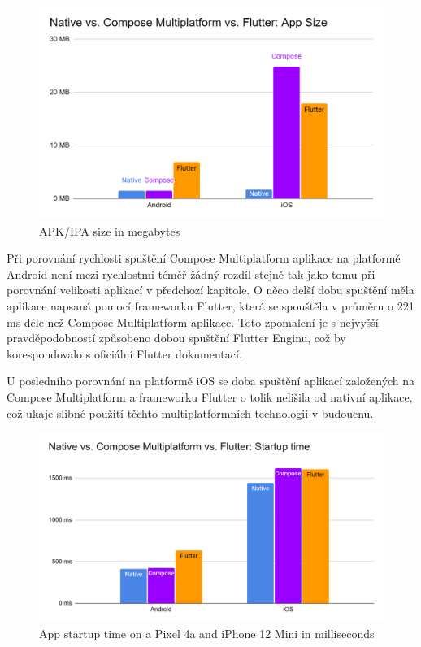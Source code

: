 \begin{figure}[H]
  \centering
  \includegraphics[width=.7\textwidth]{chart_app_sizes.png}
  \caption{APK/IPA size in megabytes}
  \label{fig:chart_app_sizes}
\end{figure}


Při porovnání rychlosti spuštění Compose Multiplatform aplikace na platformě Android není mezi rychlostmi téměř žádný
rozdíl stejně tak jako tomu při porovnání velikosti aplikací v předchozí kapitole. O něco delší dobu spuštění měla
aplikace napsaná pomocí frameworku Flutter, která se spouštěla v průměru o 221 ms déle než Compose Multiplatform aplikace. 
Toto zpomalení je s nejvyšší pravděpodobností způsobeno dobou spuštění Flutter Enginu, což by korespondovalo s oficiální
Flutter dokumentací. \cite{flutterPerformance}

U posledního porovnání na platformě iOS se doba spuštění aplikací založených na Compose Multiplatform a frameworku 
Flutter o tolik nelišila od nativní aplikace, což ukaje slibné použití těchto multiplatformních technologií v budoucnu.

\begin{figure}[H]
  \centering
  \includegraphics[width=.7\textwidth]{chart_startup_times.png}
  \caption{App startup time on a Pixel 4a and iPhone 12 Mini in milliseconds}
  \label{fig:chart_startup_times}
\end{figure}

